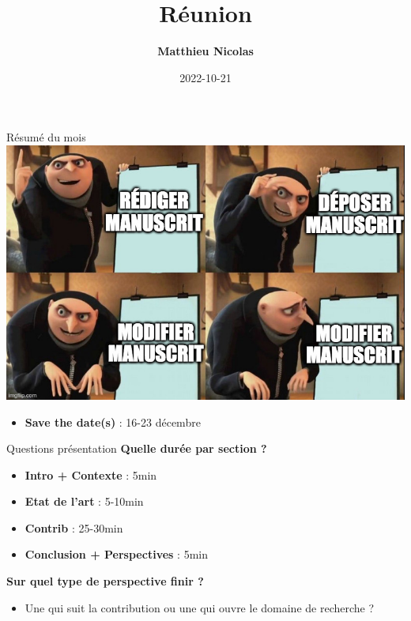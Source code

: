 \documentclass[12pt]{beamer}
\date{2022-10-21}
\author{
  \textbf{Matthieu Nicolas}
}
\title{Réunion}
\subtitle{}
\institute{}
\begin{document}
\maketitle

\begin{frame}{Résumé du mois}
  \centering
  \includegraphics[width=0.9 \linewidth]{img/meme.jpg}
  \pause
  \begin{itemize}
    \item \textbf{Save the date(s)} : 16-23 décembre
  \end{itemize}
\end{frame}

\begin{frame}{Questions présentation}
  \textbf{Quelle durée par section ?}
  \begin{itemize}
    \item \textbf{Intro + Contexte} : 5min
    \item \textbf{Etat de l'art} : 5-10min
    \item \textbf{Contrib} : 25-30min
    \item \textbf{Conclusion + Perspectives} : 5min
  \end{itemize}
  \pause
  \textbf{Sur quel type de perspective finir ?}
  \begin{itemize}
    \item Une qui suit la contribution ou une qui ouvre le domaine de recherche ?
  \end{itemize}
\end{frame}
\end{document}

